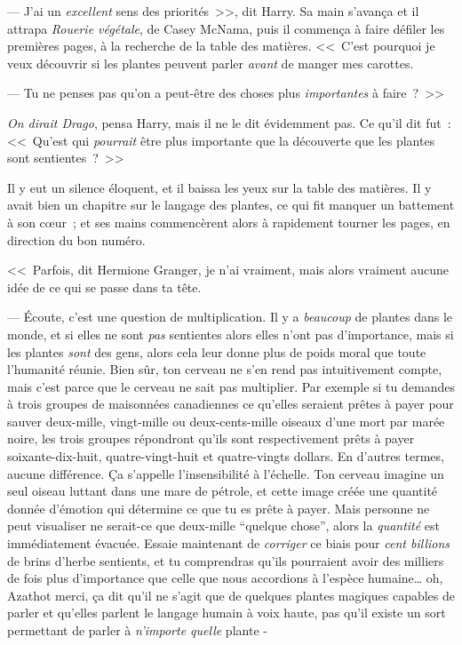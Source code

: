 --- J'ai un \emph{excellent} sens des priorités~>>, dit Harry. Sa main s'avança et il attrapa \emph{Rouerie végétale}, de Casey McNama, puis il commença à faire défiler les premières pages, à la recherche de la table des matières. <<~C'est pourquoi je veux découvrir si les plantes peuvent parler \emph{avant} de manger mes carottes.

--- Tu ne penses pas qu'on a peut-être des choses plus \emph{importantes} à faire~?~>>

\emph{On dirait Drago}, pensa Harry, mais il ne le dit évidemment pas. Ce qu'il dit fut~: <<~Qu'est qui \emph{pourrait} être plus importante que la découverte que les plantes sont sentientes~?~>>

Il y eut un silence éloquent, et il baissa les yeux sur la table des matières. Il y avait bien un chapitre sur le langage des plantes, ce qui fit manquer un battement à son cœur~; et ses mains commencèrent alors à rapidement tourner les pages, en direction du bon numéro.

<<~Parfois, dit Hermione Granger, je n'ai vraiment, mais alors vraiment aucune idée de ce qui se passe dans ta tête.

--- Écoute, c'est une question de multiplication. Il y a \emph{beaucoup} de plantes dans le monde, et si elles ne sont \emph{pas} sentientes alors elles n'ont pas d'importance, mais si les plantes \emph{sont} des gens, alors cela leur donne plus de poids moral que toute l'humanité réunie. Bien sûr, ton cerveau ne s'en rend pas intuitivement compte, mais c'est parce que le cerveau ne sait pas multiplier. Par exemple si tu demandes à trois groupes de maisonnées canadiennes ce qu'elles seraient prêtes à payer pour sauver deux-mille, vingt-mille ou deux-cents-mille oiseaux d'une mort par marée noire, les trois groupes répondront qu'ils sont respectivement prêts à payer soixante-dix-huit, quatre-vingt-huit et quatre-vingts dollars. En d'autres termes, aucune différence. Ça s'appelle l'insensibilité à l'échelle. Ton cerveau imagine un seul oiseau luttant dans une mare de pétrole, et cette image créée une quantité donnée d'émotion qui détermine ce que tu es prête à payer. Mais personne ne peut visualiser ne serait-ce que deux-mille “quelque chose”, alors la \emph{quantité} est immédiatement évacuée. Essaie maintenant de \emph{corriger} ce biais pour \emph{cent billions} de brins d'herbe sentients, et tu comprendras qu'ils pourraient avoir des milliers de fois plus d'importance que celle que nous accordions à l'espèce humaine… oh, Azathot merci, ça dit qu'il ne s'agit que de quelques plantes magiques capables de parler et qu'elles parlent le langage humain à voix haute, pas qu'il existe un sort permettant de parler à \emph{n'importe quelle} plante -

